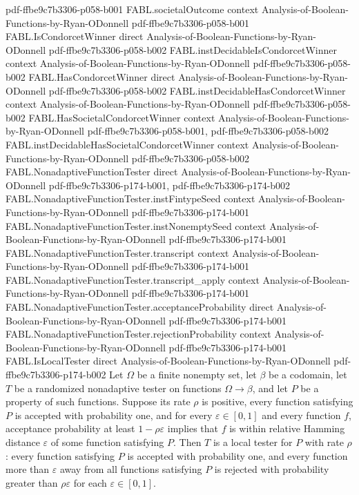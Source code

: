 \begin{theorem}
  {pdf-ffbe9c7b3306-p058-b001}
\proofstep
  {FABL.societalOutcome}
  {context}
  {Analysis-of-Boolean-Functions-by-Ryan-ODonnell}
  {pdf-ffbe9c7b3306-p058-b001}
\proofstep
  {FABL.IsCondorcetWinner}
  {direct}
  {Analysis-of-Boolean-Functions-by-Ryan-ODonnell}
  {pdf-ffbe9c7b3306-p058-b002}
\proofstep
  {FABL.instDecidableIsCondorcetWinner}
  {context}
  {Analysis-of-Boolean-Functions-by-Ryan-ODonnell}
  {pdf-ffbe9c7b3306-p058-b002}
\proofstep
  {FABL.HasCondorcetWinner}
  {direct}
  {Analysis-of-Boolean-Functions-by-Ryan-ODonnell}
  {pdf-ffbe9c7b3306-p058-b002}
\proofstep
  {FABL.instDecidableHasCondorcetWinner}
  {context}
  {Analysis-of-Boolean-Functions-by-Ryan-ODonnell}
  {pdf-ffbe9c7b3306-p058-b002}
\proofstep
  {FABL.HasSocietalCondorcetWinner}
  {context}
  {Analysis-of-Boolean-Functions-by-Ryan-ODonnell}
  {pdf-ffbe9c7b3306-p058-b001,
    pdf-ffbe9c7b3306-p058-b002}
\proofstep
  {FABL.instDecidableHasSocietalCondorcetWinner}
  {context}
  {Analysis-of-Boolean-Functions-by-Ryan-ODonnell}
  {pdf-ffbe9c7b3306-p058-b002}
\proofstep
  {FABL.NonadaptiveFunctionTester}
  {direct}
  {Analysis-of-Boolean-Functions-by-Ryan-ODonnell}
  {pdf-ffbe9c7b3306-p174-b001,
    pdf-ffbe9c7b3306-p174-b002}
\proofstep
  {FABL.NonadaptiveFunctionTester.instFintypeSeed}
  {context}
  {Analysis-of-Boolean-Functions-by-Ryan-ODonnell}
  {pdf-ffbe9c7b3306-p174-b001}
\proofstep
  {FABL.NonadaptiveFunctionTester.instNonemptySeed}
  {context}
  {Analysis-of-Boolean-Functions-by-Ryan-ODonnell}
  {pdf-ffbe9c7b3306-p174-b001}
\proofstep
  {FABL.NonadaptiveFunctionTester.transcript}
  {context}
  {Analysis-of-Boolean-Functions-by-Ryan-ODonnell}
  {pdf-ffbe9c7b3306-p174-b001}
\proofstep
  {FABL.NonadaptiveFunctionTester.transcript_apply}
  {context}
  {Analysis-of-Boolean-Functions-by-Ryan-ODonnell}
  {pdf-ffbe9c7b3306-p174-b001}
\proofstep
  {FABL.NonadaptiveFunctionTester.acceptanceProbability}
  {direct}
  {Analysis-of-Boolean-Functions-by-Ryan-ODonnell}
  {pdf-ffbe9c7b3306-p174-b001}
\proofstep
  {FABL.NonadaptiveFunctionTester.rejectionProbability}
  {context}
  {Analysis-of-Boolean-Functions-by-Ryan-ODonnell}
  {pdf-ffbe9c7b3306-p174-b001}
\proofstep
  {FABL.IsLocalTester}
  {direct}
  {Analysis-of-Boolean-Functions-by-Ryan-ODonnell}
  {pdf-ffbe9c7b3306-p174-b002}
Let $\Omega$ be a finite nonempty set, let $\beta$ be a codomain, let $T$ be a
randomized nonadaptive tester on functions $\Omega\to\beta$, and let $P$ be a property
of such functions. Suppose its rate $\rho$ is positive, every function satisfying $P$ is
accepted with probability one, and for every $\varepsilon\in[0,1]$ and every function
$f$, acceptance probability at least $1-\rho\varepsilon$ implies that $f$ is within
relative Hamming distance $\varepsilon$ of some function satisfying $P$. Then $T$ is a
local tester for $P$ with rate $\rho$: every function satisfying $P$ is accepted with
probability one, and every function more than $\varepsilon$ away from all functions
satisfying $P$ is rejected with probability greater than $\rho\varepsilon$ for each
$\varepsilon\in[0,1]$.
\end{theorem}

